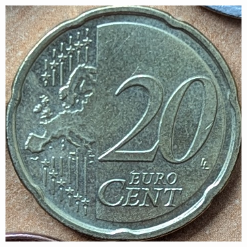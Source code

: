 \begin{figure}[ht]
\begin{subfigure}{0.23\textwidth}
    \end{subfigure}
    \begin{subfigure}{0.23\textwidth}
        \includegraphics[width=\linewidth]{../CoinFinder/templates_2/Cent20.png}
    \end{subfigure}


\end{figure}
